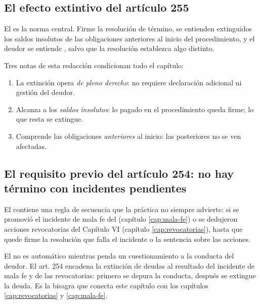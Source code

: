 \bloqueNormativo

\subsection{El efecto extintivo del artículo 255}

El  es la norma central. Firme la resolución de término, se entienden extinguidos
 los saldos
insolutos de las obligaciones anteriores al inicio del procedimiento, y el deudor se entiende
, salvo que la resolución establezca
algo distinto.

Tres notas de esta redacción condicionan todo el capítulo:

\begin{enumerate}
  \item La extinción opera \emph{de pleno derecho}: no requiere declaración adicional ni
  gestión del deudor.
  \item Alcanza a los \emph{saldos insolutos}: lo pagado en el procedimiento queda firme; lo
  que resta se extingue.
  \item Comprende las obligaciones \emph{anteriores} al inicio: las posteriores no se ven
  afectadas.
\end{enumerate}

\subsection{El requisito previo del artículo 254: no hay término con incidentes pendientes}

El  contiene una regla de secuencia que la práctica no siempre advierte: si se
promovió el incidente de mala fe del  (capítulo \ref{cap:mala-fe}) o se dedujeron
acciones revocatorias del Capítulo VI (capítulo \ref{cap:revocatorias}),  hasta que quede firme la resolución que falla el
incidente o la sentencia sobre las acciones.

\begin{foco}
El \discharge{} no es automático mientras penda un cuestionamiento a la conducta del deudor.
El art. 254 encadena la extinción de deudas al resultado del incidente de mala fe y de las
revocatorias: primero se depura la conducta, después se extingue la deuda. Es la bisagra que
conecta este capítulo con los capítulos \ref{cap:revocatorias} y \ref{cap:mala-fe}.
\end{foco}

